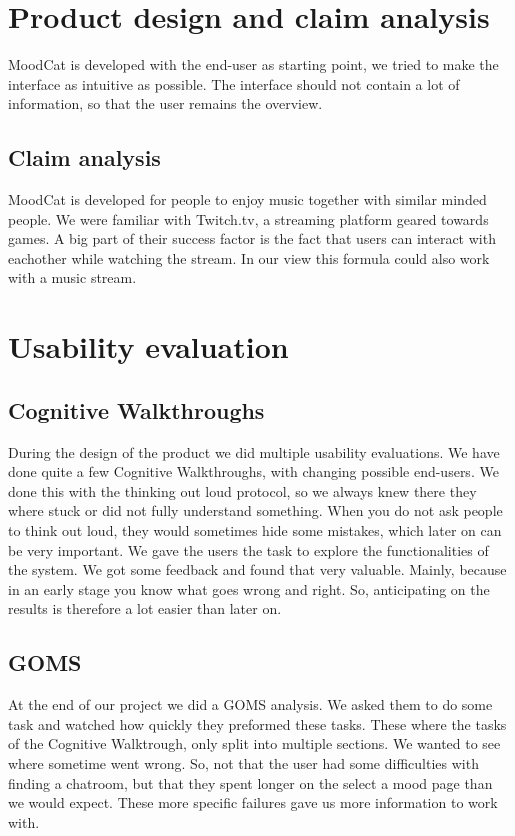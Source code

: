 
\section{Product design and claim analysis}
MoodCat is developed with the end-user as starting point, we tried to make the interface as intuitive as possible.
The interface should not contain a lot of information, so that the user remains the overview.

\subsection{Claim analysis}
MoodCat is developed for people to enjoy music together with similar minded people.
We were familiar with Twitch.tv, a streaming platform geared towards games. A big part of their success factor is the fact that users can interact with eachother while watching the stream. In our view this formula could also work with a music stream.

\section{Usability evaluation}
\subsection{Cognitive Walkthroughs}
During the design of the product we did multiple usability evaluations.
We have done quite a few Cognitive Walkthroughs, with changing possible end-users.
We done this with the thinking out loud protocol, so we always knew there they where stuck or did not fully understand something.
When you do not ask people to think out loud, they would sometimes hide some mistakes, which later on can be very important.
We gave the users the task to explore the functionalities of the system.
We got some feedback and found that very valuable.
Mainly, because in an early stage you know what goes wrong and right. 
So, anticipating on the results is therefore a lot easier than later on.
\subsection{GOMS}
At the end of our project we did a GOMS analysis.
We asked them to do some task and watched how quickly they preformed these tasks.
These where the tasks of the Cognitive Walktrough, only split into multiple sections.
We wanted to see where sometime went wrong. 
So, not that the user had some difficulties with finding a chatroom, but that they spent longer on the select a mood page than we would expect.
These more specific failures gave us more information to work with.

